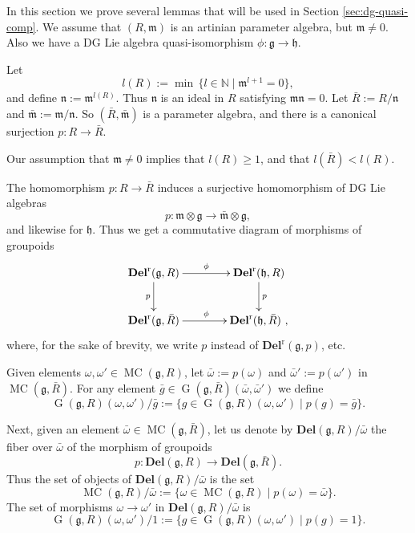 \documentclass[a4paper,10pt]{amsart}
\theoremstyle{definition}
\numberwithin{equation}{section}
\newcommand{\opn}{\operatorname}
\newcommand{\mfrak}[1]{\mathfrak{#1}}
\newcommand{\mbf}[1]{\mathbf{#1}}
\newcommand{\mrm}[1]{\mathrm{#1}}
\newcommand{\mbb}[1]{\mathbb{#1}}
\newcommand{\N}{\mbb{N}}
\newcommand{\g}{\mfrak{g}}
\newcommand{\m}{\mfrak{m}}
\newcommand{\h}{\mfrak{h}}
\newcommand{\n}{\mfrak{n}}
\newcommand{\om}{\omega}
\newcommand{\lb}{\linebreak}
\begin{document}
In this section we prove several lemmas that will be used in Section 
\ref{sec:dg-quasi-comp}. We assume that 
$(R, \m)$ is an artinian parameter algebra, but $\m \neq 0$. Also we have a DG
Lie algebra quasi-isomorphism $\phi : \g \to \h$. 

Let 
\[ l(R) := \min\, \{ l \in \N \mid \m^{l+1} = 0 \} , \]
and define $\n := \m^{l(R)}$. Thus $\n$ is an ideal in $R$ satisfying 
$\m \n = 0$. Let 
$\bar{R} := R / \n$ and $\bar{\m} := \m / \n$. 
So $(\bar{R}, \bar{\m})$ is a parameter algebra, and there is a 
canonical surjection $p : R \to \bar{R}$.

Our assumption that $\m \neq 0$ implies that $l(R) \geq 1$, and that
$l(\bar{R}) < l(R)$.

The homomorphism $p : R \to \bar{R}$ induces a surjective homomorphism of DG Lie
algebras 
\[ p : \m \otimes \g \to \bar{\m} \otimes \g , \]
and likewise for $\h$. Thus we get a commutative diagram of morphisms of \lb
groupoids 
\[ \UseTips \xymatrix @C=9ex @R=6ex {
\mbf{Del}^{\mrm{r}}(\g, R)
\ar[r]^{\phi}
\ar[d]_{p}
&
\mbf{Del}^{\mrm{r}}(\h, R)
\ar[d]^{p}
\\
\mbf{Del}^{\mrm{r}}(\g, \bar{R})
\ar[r]^{\phi}
&
\mbf{Del}^{\mrm{r}}(\h, \bar{R}) \ ,
} \]
where, for the sake of brevity, we write $p$ instead of 
$\mbf{Del}^{\mrm{r}}(\g, p)$, etc. 

Given elements $\om, \om' \in \opn{MC}(\g, R)$, let
$\bar{\om} := p(\om)$ and $\bar{\om}' := p(\om')$ in 
$\opn{MC}(\g, \bar{R})$. For any element 
$\bar{g} \in \opn{G}(\g, \bar{R})(\bar{\om}, \bar{\om}')$
we define 
\begin{equation} \label{eqn:4}
\opn{G}(\g, R)(\om, \om') / \bar{g} :=  
\{ g \in \opn{G}(\g, R)(\om, \om') \mid p(g) = \bar{g} \} .
\end{equation}

Next, given an element $\bar{\om} \in \opn{MC}(\g, \bar{R})$, 
let us denote by $\mbf{Del}(\g, R) / \bar{\om}$ 
the fiber over $\bar{\om}$ of the morphism of groupoids 
\[ p : \mbf{Del}(\g, R) \to \mbf{Del}(\g, \bar{R}) . \]
Thus the set of objects of  $\mbf{Del}(\g, R) / \bar{\om}$ is the set 
\begin{equation}
\opn{MC}(\g, R) / \bar{\om} := \{ \om \in \opn{MC}(\g, R) \mid 
p(\om) = \bar{\om} \} .
\end{equation}
The set of morphisms $\om \to \om'$ in $\mbf{Del}(\g, R) / \bar{\om}$ 
is 
\begin{equation}
\opn{G}(\g, R)(\om, \om') / 1 :=  
\{ g \in \opn{G}(\g, R)(\om, \om') \mid p(g) = 1 \} . 
\end{equation}
\end{document}

